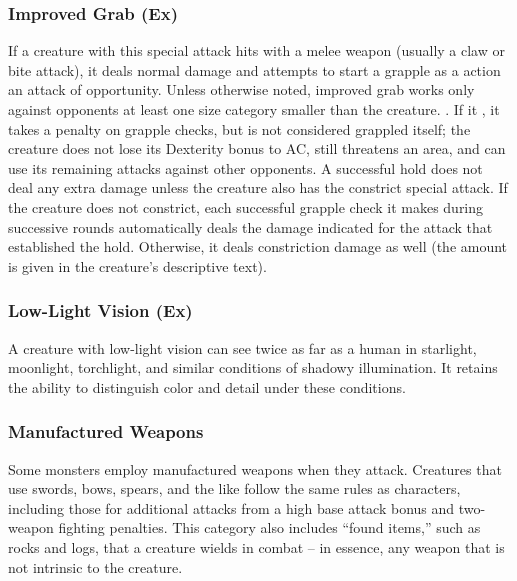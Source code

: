 \subsubsection{Improved Grab (Ex)} If a creature with this special attack hits with a melee weapon (usually a claw or bite attack), it deals normal damage and attempts to start a grapple as a  action  an attack of opportunity. Unless otherwise noted, improved grab works only against opponents at least one size category smaller than the creature. . If it , it takes a  penalty on grapple checks, but is not considered grappled itself; the creature does not lose its Dexterity bonus  to AC, still threatens an area, and can use its remaining attacks against other opponents. A successful hold does not deal any extra damage unless the creature also has the constrict special attack. If the creature does not constrict, each successful grapple check it makes during successive rounds automatically deals the damage indicated for the attack that established the hold. Otherwise, it deals constriction damage as well (the amount is given in the creature's descriptive text).

\subsubsection{Low-Light Vision (Ex)} A creature with low-light vision can see twice as far as a human in starlight, moonlight, torchlight, and similar conditions of shadowy illumination. It retains the ability to distinguish color and detail under these conditions.

\subsubsection{Manufactured Weapons} Some monsters employ manufactured weapons when they attack. Creatures that use swords, bows, spears, and the like follow the same rules as characters, including those for additional attacks from a high base attack bonus and two-weapon fighting penalties. This category also includes ``found items,'' such as rocks and logs, that a creature wields in combat -- in essence, any weapon that is not intrinsic to the creature.

